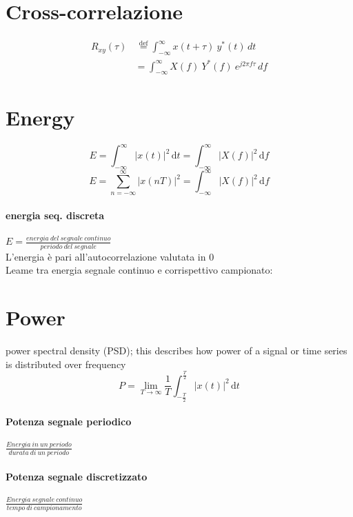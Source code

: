\documentclass[12pt,a4paper,]{article}
\begin{document}
 \section{Cross-correlazione}
 \begin{align}
 R_{xy} (\tau) & \, \stackrel{\mathrm{def}}{=}  \int_{-\infty}^{\infty} x(t+\tau)\ y^*(t) \,dt \\
 & = \int_{-\infty}^{\infty} X(f)\ Y^*(f)\ e^{j2\pi f \tau} \,df
 \end{align}
\section{Energy}
\begin{equation}
E= \int_{-\infty}^{\infty} \! |x(t)|^{2}\, \mathrm{d}t = \int_{-\infty}^{\infty} \! |X(f)|^{2}\, \mathrm{d}f
\end{equation}
\begin{equation}
E= \sum_{n=-\infty}^{\infty} \! |x(nT)|^{2} = \int_{-\infty}^{\infty} \! |X(f)|^{2}\, \mathrm{d}f
\end{equation}
\paragraph{energia seq. discreta} $E= \frac{energia\: del\: segnale\: continuo}{periodo\: del\: segnale}$ \\ 

L'energia è pari all'autocorrelazione valutata in 0\\
Leame tra energia segnale continuo e corrispettivo campionato:
\section{Power}
power spectral density (PSD); this describes how power of a signal or time series is distributed over frequency
\begin{equation}
P= \lim_{T\to\infty} \frac{1}{T} \int_{-\frac{T}{2}}^{\frac{T}{2}} \! |x(t)|^{2}\, \mathrm{d}t 
\end{equation}
 \paragraph{Potenza segnale  periodico }
 $\frac{Energia \: in \: un\:  periodo}{durata \: di \: un \: periodo}$
  \paragraph{Potenza segnale  discretizzato }
 $\frac{Energia\: segnale\: continuo}{tempo \: di \: campionamento}$
\end{document}
